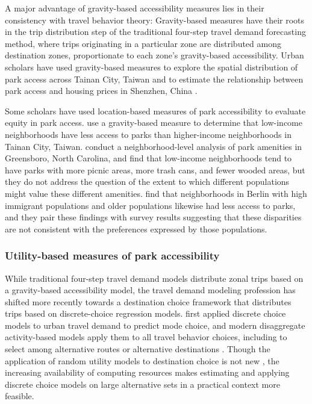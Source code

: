 \documentclass[3p, authoryear]{elsarticle} %
\begin{document}
A major advantage of gravity-based accessibility measures lies in their
consistency with travel behavior theory: Gravity-based measures have their roots
in the trip distribution step of the traditional four-step travel demand
forecasting method, where trips originating in a particular zone are distributed
among destination zones, proportionate to each zone's gravity-based
accessibility. Urban scholars have used gravity-based measures to explore the
spatial distribution of park access across Tainan City, Taiwan
\citep{chang2011exploring} and to estimate the relationship between park access and
housing prices in Shenzhen, China \citep{wu2017spatial}.

Some scholars have used location-based measures of park accessibility to
evaluate equity in park access. \citet{chang2011exploring} use a gravity-based measure
to determine that low-income neighborhoods have less access to parks than
higher-income neighborhoods in Tainan City, Taiwan. \citet{bruton2014disparities}
conduct a neighborhood-level analysis of park amenities in Greensboro, North
Carolina, and find that low-income neighborhoods tend to have parks with more
picnic areas, more trash cans, and fewer wooded areas, but they do not address
the question of the extent to which different populations might value these
different amenities. \citet{kabisch2014green} find that neighborhoods in Berlin with
high immigrant populations and older populations likewise had less access to
parks, and they pair these findings with survey results suggesting that these
disparities are not consistent with the preferences expressed by those
populations.

\hypertarget{utility-based-measures-of-park-accessibility}{%
\subsubsection{Utility-based measures of park accessibility}\label{utility-based-measures-of-park-accessibility}}

While traditional four-step travel demand models distribute zonal trips based on
a gravity-based accessibility model, the travel demand modeling profession has
shifted more recently towards a destination choice framework that distributes
trips based on discrete-choice regression models. \citet{mcfadden1974measurement}
first applied discrete choice models to urban travel demand to predict mode
choice, and modern disaggregate activity-based models apply them to all travel
behavior choices, including to select among alternative routes or alternative
destinations \citep{de2011modelling}. Though the application of random utility models
to destination choice is not new \citep[see][]{anas1983discrete}, the increasing
availability of computing resources makes estimating and applying discrete
choice models on large alternative sets in a practical context more feasible.
\end{document}
